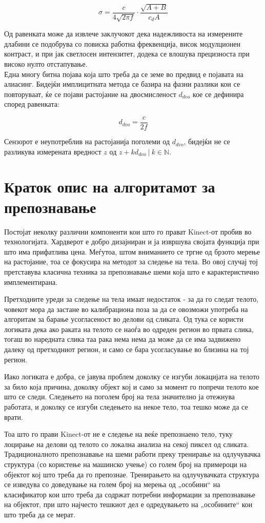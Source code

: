\documentclass[12pt]{article}
\begin{document}
		$$ \sigma = \frac{c}{4\sqrt{2\pi f}} \cdot \frac{\sqrt{A+B}}{c_d A} $$

		Од равенката може да извлече заклучокот дека надежливоста на измерените длабини се подобрува со повиска работна фреквенција, висок модулционен контраст, и при јак светлосен интензитет, додека се влошува прецизноста при високо нулто отстапување.
		\\
		Една многу битна појава која што треба да се земе во предвид е појавата на алиасинг. Бидејќи имплицитната метода се базира на фазни разлики кои се повторуваат, ќе се појави растојание на двосмисленост $d_{dvo}$ кое се дефинира според равенката:

		$$ d_{dvo} = \frac{c}{2f} $$

		Сензорот е неупотреблив на растојанија поголеми од $d_{dvo}$, бидејќи не се разликува измерената вредност $z$ од $z + k d_{dvo}\ | \ k \in \mathbb{N}$.

\newpage

\section{Краток опис на алгоритамот за препознавање}

  Постојат неколку различни компоненти кои што го прават Kinect-от пробив во технологијата. Хардверот е добро дизајниран и ја извршува својата функција при што има прифатлива цена. Меѓутоа, штом вниманието се тргне од брзото мерење на растојание, тоа се фокусира на методот за следење на тела. Во овој случај тој претставува класична техника за препознавање шеми која што е карактеристично имплементирана.

	Претходните уреди за следење на тела имаат недостаток - за да го следат телото, човекот мора да застане во калибрациона поза за да се овозможи употреба на алгоритам за барање усогласеност во делови од сликата. Од тука се користи логиката дека ако раката на телото се наоѓа во одреден регион во првата слика, тогаш во наредната слика таа рака нема нема да може да се има задвижено далеку од претходниот регион, и само се бара усогласување во близина на тој регион.

	Иако логиката е добра, се јавува проблем доколку се изгуби локацијата на телото за било која причина, доколку објект кој и само за момент го попречи телото кое што се следи. Следењето на поголем број на тела значително ја отежнува работата, и доколку се изгуби следењето на некое тело, тоа тешко може да се врати.

	Тоа што го прави Kinect-от не е следење на веќе препознаено тело, туку лоцирање на делови од телото со локална анализа на секој пиксел од сликата. Традиционалното препознавање на шеми работи преку тренирање на одлучувачка структура (со користење на машинско учење) со голем број на примероци на објектот кој што треба да го препознае. Тренирањето на одлучувачката структура се изведува со доведување на голем број на мерења од „особини“ на класификатор кои што треба да содржат потребни информации за препознавање на објектот, при што најчесто тешкиот дел е одредувањето на „особините“ кои што треба да се мерат.
\end{document}
